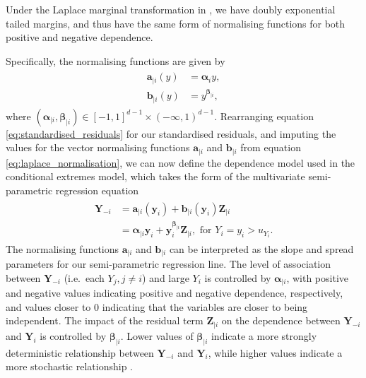\documentclass{article}
\numberwithin{equation}{section}
\begin{document}
Under the Laplace marginal transformation in \citep{Keef2013}, we have doubly exponential tailed margins, and thus have the same form of normalising functions for both positive and negative dependence.

Specifically, the normalising functions are given by
\begin{align} \label{eq:laplace_normalisation}
  \begin{split}
    \bm{a}_{\mid i}(y) &= \bm{\alpha}_i y, \\
    \bm{b}_{\mid i}(y) &= y^{\bm{\beta}_{\mid i}}, 
  \end{split}
\end{align}
where $(\bm{\alpha}_{\mid i}, \bm{\beta}_{\mid i}) \in [-1, 1]^{d-1} \times (-\infty, 1)^{d-1}$. %
Rearranging equation \eqref{eq:standardised_residuals} for our standardised residuals, and imputing the values for the vector normalising functions $\bm{a}_{\mid i}$ and $\bm{b}_{\mid i}$ from equation \eqref{eq:laplace_normalisation}, we can now define the dependence model used in the conditional extremes model, which takes the form of the multivariate semi-parametric regression equation
\begin{align} \label{eq:ce_model}
  \begin{split}
    \bm{Y}_{-i} &= \bm{a}_{\mid i}(\bm{y}_i) + \bm{b}_{\mid i}(\bm{y}_i)\bm{Z}_{\mid i} \\
                &= \bm{\alpha}_{\mid i}\bm{y}_i + \bm{y}_i^{\bm{\beta}_{\mid i}}\bm{Z}_{\mid i}, \text{ for } Y_i = y_i > u_{Y_i}.
  \end{split}
\end{align}
The normalising functions $\bm{a}_{\mid i}$ and $\bm{b}_{\mid i}$ can be interpreted as the slope and spread parameters for our semi-parametric regression line.
The level of association between $\bm{Y}_{-i}$ (i.e.\ each $Y_j, j \ne i$) and large $Y_i$ is controlled by $\bm{\alpha}_{\mid i}$, with positive and negative values indicating positive and negative dependence, respectively, and values closer to 0 indicating that the variables are closer to being independent.
The impact of the residual term $\bm{Z}_{\mid i}$ on the dependence between $\bm{Y}_{-i}$ and $\bm{Y}_i$ is controlled by $\bm{\beta}_{\mid i}$.
Lower values of $\bm{\beta}_{\mid i}$ indicate a more strongly deterministic relationship between $\bm{Y}_{-i}$ and $\bm{Y}_i$, while higher values indicate a more stochastic relationship \citep{Winter2016}.
\end{document}
